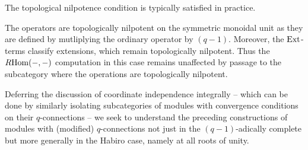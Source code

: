 \begin{remark}
    The topological nilpotence condition is typically satisfied in practice. 
\end{remark}
\begin{remark}
    The operators are topologically nilpotent on the symmetric monoidal unit as they are defined by mutliplying the ordinary operator by $(q-1)$. Moreover, the $\mathrm{Ext}$-terms classify extensions, which remain topologically nilpotent. Thus the $R\mathrm{Hom}(-,-)$ computation in this case remains unaffected by passage to the subcategory where the operations are topologically nilpotent. 
\end{remark}
Deferring the discussion of coordinate independence integrally -- which can be done by similarly isolating subcategories of modules with convergence conditions on their $q$-connections -- we seek to understand the preceding constructions of modules with (modified) $q$-connections not just in the $(q-1)$-adically complete but more generally in the Habiro case, namely at all roots of unity. 


